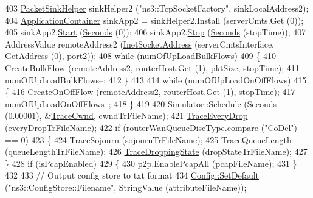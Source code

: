 \begin{DoxyCode}
403   \hyperlink{classns3_1_1PacketSinkHelper}{PacketSinkHelper} sinkHelper2 (\textcolor{stringliteral}{"ns3::TcpSocketFactory"}, sinkLocalAddress2);
404   \hyperlink{classns3_1_1ApplicationContainer}{ApplicationContainer} sinkApp2 = sinkHelper2.Install (serverCmts.Get (0));
405   sinkApp2.\hyperlink{classns3_1_1ApplicationContainer_a8eff87926507020bbe3e1390358a54a7}{Start} (\hyperlink{group__timecivil_ga33c34b816f8ff6628e33d5c8e9713b9e}{Seconds} (0));
406   sinkApp2.\hyperlink{classns3_1_1ApplicationContainer_adfc52f9aa4020c8714679b00bbb9ddb3}{Stop} (\hyperlink{group__timecivil_ga33c34b816f8ff6628e33d5c8e9713b9e}{Seconds} (stopTime));
407   AddressValue remoteAddress2 (\hyperlink{classns3_1_1InetSocketAddress}{InetSocketAddress} (serverCmtsInterface.
      \hyperlink{classns3_1_1Ipv4InterfaceContainer_ae63208dcd222be986822937ee4aa828c}{GetAddress} (0), port2));
408   \textcolor{keywordflow}{while} (numOfUpLoadBulkFlows)
409     \{
410       \hyperlink{codel-vs-pfifo-asymmetric_8cc_a4d992db17e839d6d89204a95be422763}{CreateBulkFlow} (remoteAddress2, routerHost.Get (1), pktSize, stopTime);
411       numOfUpLoadBulkFlows--;
412     \}
413 
414   \textcolor{keywordflow}{while} (numOfUpLoadOnOffFlows)
415     \{
416       \hyperlink{codel-vs-pfifo-asymmetric_8cc_aa3d189125687c5d379924c22326d45eb}{CreateOnOffFlow} (remoteAddress2, routerHost.Get (1), stopTime);
417       numOfUpLoadOnOffFlows--;
418     \}
419 
420   Simulator::Schedule (\hyperlink{group__timecivil_ga33c34b816f8ff6628e33d5c8e9713b9e}{Seconds} (0.00001), &\hyperlink{codel-vs-pfifo-asymmetric_8cc_a14abe7eeb70cac35caeaf197fff9942d}{TraceCwnd}, cwndTrFileName);
421   \hyperlink{codel-vs-pfifo-asymmetric_8cc_acc8c5885e95cf5d91788a281acfe977f}{TraceEveryDrop} (everyDropTrFileName);
422   \textcolor{keywordflow}{if} (routerWanQueueDiscType.compare (\textcolor{stringliteral}{"CoDel"}) == 0)
423     \{
424       \hyperlink{codel-vs-pfifo-asymmetric_8cc_aa8f91732b16706b6be64dda090e6d90e}{TraceSojourn} (sojournTrFileName);
425       \hyperlink{codel-vs-pfifo-asymmetric_8cc_ad42ad75e7dad477cc7b101512f13f0a9}{TraceQueueLength} (queueLengthTrFileName);
426       \hyperlink{codel-vs-pfifo-asymmetric_8cc_a20d7d9452b7e5c42ebc464a728682614}{TraceDroppingState} (dropStateTrFileName);
427     \}
428   \textcolor{keywordflow}{if} (isPcapEnabled)
429     \{
430       p2p.\hyperlink{classns3_1_1PcapHelperForDevice_a4ab183a2512120200d4a0e5d8ececd49}{EnablePcapAll} (pcapFileName);
431     \}
432 
433   \textcolor{comment}{// Output config store to txt format}
434   \hyperlink{group__config_ga2e7882df849d8ba4aaad31c934c40c06}{Config::SetDefault} (\textcolor{stringliteral}{"ns3::ConfigStore::Filename"}, StringValue (attributeFileName));

\end{DoxyCode}

